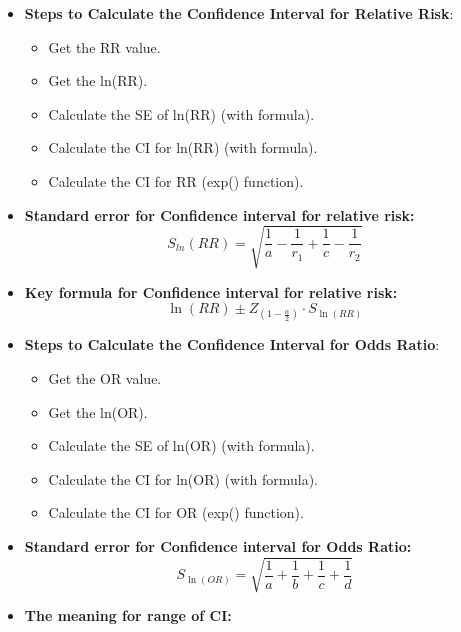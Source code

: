 \documentclass[12pt]{book}
\begin{document}
\begin{itemize}
\item \textbf{Steps to Calculate the Confidence Interval for Relative Risk}:
    \begin{itemize}
    \item Get the RR value.
    \item Get the ln(RR).
    \item Calculate the SE of ln(RR) (with formula).
    \item Calculate the CI for ln(RR) (with formula).
    \item Calculate the CI for RR (exp() function).
    \end{itemize}
\item \textbf{Standard error for Confidence interval for relative risk:}$$S_{ln}(RR) = \sqrt{\frac{1}{a} - \frac{1}{r_1} + \frac{1}{c} - \frac{1}{r_2}}$$
\item \textbf{Key formula for Confidence interval for relative risk:}$$\ln(RR) \pm Z_{(1-\frac{\alpha}{2})} \cdot S_{\ln(RR)}$$
\item \textbf{Steps to Calculate the Confidence Interval for Odds Ratio}:
    \begin{itemize}
    \item Get the OR value.
    \item Get the ln(OR).
    \item Calculate the SE of ln(OR) (with formula).
    \item Calculate the CI for ln(OR) (with formula).
    \item Calculate the CI for OR (exp() function).
    \end{itemize}
\item \textbf{Standard error for Confidence interval for Odds Ratio:} $$S_{\ln(OR)} = \sqrt{\frac{1}{a} + \frac{1}{b} + \frac{1}{c} + \frac{1}{d}}$$
\item \textbf{The meaning for range of CI:}
\begin{figure} [H]
\centering
{}
\end{figure}
\end{itemize}
\end{document}
